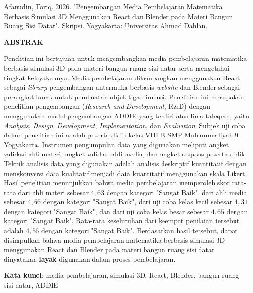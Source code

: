 \newpage
{}

Afanudin, Toriq. 2026. "Pengembangan Media Pembelajaran Matematika Berbasis Simulasi 3D Menggunakan React dan Blender pada Materi Bangun Ruang Sisi Datar". Skripsi. Yogyakarta: Universitas Ahmad Dahlan.

\vspace{0.5cm}

\begin{center}
    \textbf{ABSTRAK}
\end{center}

\hspace*{1cm}Penelitian ini bertujuan untuk mengembangkan media pembelajaran matematika berbasis simulasi 3D pada materi bangun ruang sisi datar serta mengetahui tingkat kelayakannya. Media pembelajaran dikembangkan menggunakan React sebagai \textit{library} pengembangan antarmuka berbasis \textit{website} dan Blender sebagai perangkat lunak untuk pembuatan objek tiga dimensi. Penelitian ini merupakan penelitian pengembangan (\textit{Research and Development}, R\&D) dengan menggunakan model pengembangan ADDIE yang terdiri atas lima tahapan, yaitu \textit{Analysis}, \textit{Design}, \textit{Development}, \textit{Implementation}, dan \textit{Evaluation}. Subjek uji coba dalam penelitian ini adalah peserta didik kelas VIII-B SMP Muhammadiyah 9 Yogyakarta. Instrumen pengumpulan data yang digunakan meliputi angket validasi ahli materi, angket validasi ahli media, dan angket respons peserta didik. Teknik analisis data yang digunakan adalah analisis deskriptif kuantitatif dengan mengkonversi data kualitatif menjadi data kuantitatif menggunakan skala Likert. Hasil penelitian menunjukkan bahwa media pembelajaran memperoleh skor rata-rata dari ahli materi sebesar \(4,63\) dengan kategori "Sangat Baik", dari ahli media sebesar \(4,66\) dengan kategori "Sangat Baik", dari uji coba kelas kecil sebesar \(4,31\) dengan kategori "Sangat Baik", dan dari uji coba kelas besar sebesar \(4,65\) dengan kategori "Sangat Baik". Rata-rata keseluruhan dari keempat penilaian tersebut adalah \(4,56\) dengan kategori "Sangat Baik". Berdasarkan hasil tersebut, dapat disimpulkan bahwa media pembelajaran matematika berbasis simulasi 3D menggunakan React dan Blender pada materi bangun ruang sisi datar dinyatakan \textbf{layak} digunakan dalam proses pembelajaran.

\vspace{0.5cm}

\textbf{Kata kunci}: media pembelajaran, simulasi 3D, React, Blender, bangun ruang sisi datar, ADDIE

